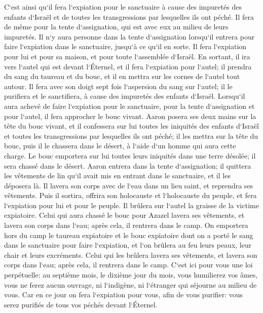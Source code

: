 \verse C`est ainsi qu`il fera l`expiation pour le sanctuaire à cause des impuretés des enfants d`Israël et de toutes les transgressions par lesquelles ils ont péché. Il fera de même pour la tente d`assignation, qui est avec eux au milieu de leurs impuretés. 
\verse Il n`y aura personne dans la tente d`assignation lorsqu`il entrera pour faire l`expiation dans le sanctuaire, jusqu`à ce qu`il en sorte. Il fera l`expiation pour lui et pour sa maison, et pour toute l`assemblée d`Israël. 
\verse En sortant, il ira vers l`autel qui est devant l`Éternel, et il fera l`expiation pour l`autel; il prendra du sang du taureau et du bouc, et il en mettra sur les cornes de l`autel tout autour. 
\verse Il fera avec son doigt sept fois l`aspersion du sang sur l`autel; il le purifiera et le sanctifiera, à cause des impuretés des enfants d`Israël. 
\verse Lorsqu`il aura achevé de faire l`expiation pour le sanctuaire, pour la tente d`assignation et pour l`autel, il fera approcher le bouc vivant. 
\verse Aaron posera ses deux mains sur la tête du bouc vivant, et il confessera sur lui toutes les iniquités des enfants d`Israël et toutes les transgressions par lesquelles ils ont péché; il les mettra sur la tête du bouc, puis il le chassera dans le désert, à l`aide d`un homme qui aura cette charge. 
\verse Le bouc emportera sur lui toutes leurs iniquités dans une terre désolée; il sera chassé dans le désert. 
\verse Aaron entrera dans la tente d`assignation; il quittera les vêtements de lin qu`il avait mis en entrant dans le sanctuaire, et il les déposera là. 
\verse Il lavera son corps avec de l`eau dans un lieu saint, et reprendra ses vêtements. Puis il sortira, offrira son holocauste et l`holocauste du peuple, et fera l`expiation pour lui et pour le peuple. 
\verse Il brûlera sur l`autel la graisse de la victime expiatoire. 
\verse Celui qui aura chassé le bouc pour Azazel lavera ses vêtements, et lavera son corps dans l`eau; après cela, il rentrera dans le camp. 
\verse On emportera hors du camp le taureau expiatoire et le bouc expiatoire dont on a porté le sang dans le sanctuaire pour faire l`expiation, et l`on brûlera au feu leurs peaux, leur chair et leurs excréments. 
\verse Celui qui les brûlera lavera ses vêtements, et lavera son corps dans l`eau; après cela, il rentrera dans le camp. 
\verse C`est ici pour vous une loi perpétuelle: au septième mois, le dixième jour du mois, vous humilierez vos âmes, vous ne ferez aucun ouvrage, ni l`indigène, ni l`étranger qui séjourne au milieu de vous. 
\verse Car en ce jour on fera l`expiation pour vous, afin de vous purifier: vous serez purifiés de tous vos péchés devant l`Éternel. 
